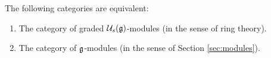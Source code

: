 \begin{proposition}
  The following categories are equivalent:
  \begin{enumerate}
  \item The category of graded $\mathcal{U}_s(\mathfrak{g})$-modules (in the sense of ring theory).
  \item The category of $\mathfrak{g}$-modules (in the sense of Section \ref{sec:modules}).
\end{enumerate}
\end{proposition}

